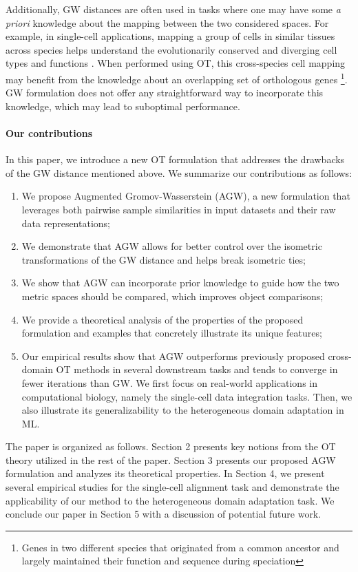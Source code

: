 Additionally, GW distances are often used in tasks where one may have some
\textit{a priori} knowledge about the mapping between the two considered spaces.
For example, in single-cell applications, mapping a group of cells in similar tissues
across species helps understand the evolutionarily conserved and diverging cell types
and functions \citep{kriebel2022uinmf}. When performed using OT, this cross-species cell mapping
may benefit from the knowledge about an overlapping set of orthologous genes
\footnote {Genes in two different species that originated from a common ancestor and
largely maintained their function and sequence during speciation}.
GW formulation does not offer any straightforward way to incorporate this knowledge,
which may lead to suboptimal performance.

\paragraph{Our contributions}
In this paper, we introduce a new OT formulation that addresses the drawbacks of the
GW distance mentioned above. We summarize our contributions as follows:
\begin{enumerate}
    \item We propose Augmented Gromov-Wasserstein (AGW), a new formulation that leverages
    both pairwise sample similarities in input datasets and their raw data representations;
    \item We demonstrate that AGW allows for better control over the isometric transformations
    of the GW distance and helps break isometric ties;
    \item We show that AGW can incorporate prior knowledge to guide how the two metric spaces
    should be compared, which improves object comparisons; %
    \item We provide a theoretical analysis of the properties of the proposed formulation
    and examples that concretely illustrate its unique features;
    \item Our empirical results show that AGW outperforms previously proposed
    cross-domain OT methods in several downstream tasks and tends to converge in fewer iterations
    than GW. We first focus on real-world applications in computational biology,
    namely the single-cell data integration tasks. Then, we also illustrate its generalizability
    to the heterogeneous domain adaptation in ML.
\end{enumerate}
The paper is organized as follows. Section 2 presents key notions from the OT theory
utilized in the rest of the paper. Section 3 presents our proposed AGW formulation and
analyzes its theoretical properties. In Section 4, we present several empirical studies
for the single-cell alignment task and demonstrate the applicability of our method to
the heterogeneous domain adaptation task. We conclude our paper in Section 5 with
a discussion of potential future work.

